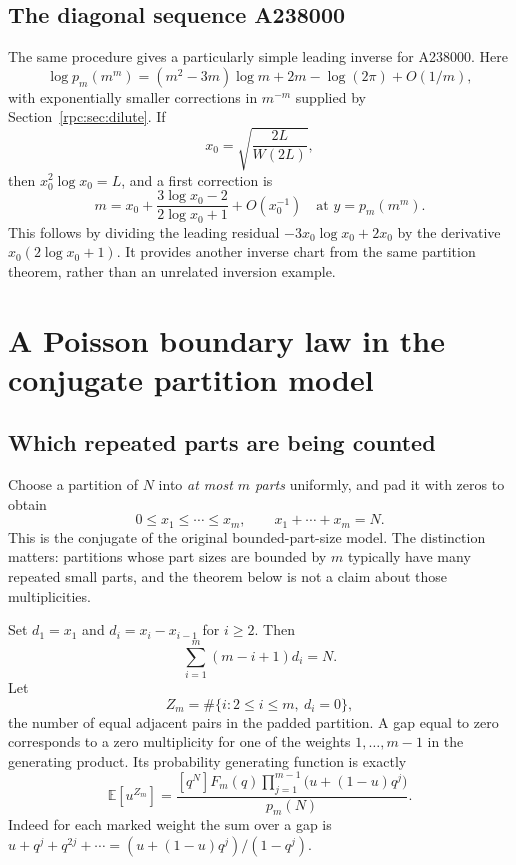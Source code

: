 \documentclass[11pt]{article}
\theoremstyle{definition}
\theoremstyle{remark}
\newcommand{\E}{\mathbb E}
\numberwithin{equation}{section}
\begin{document}
\subsection{The diagonal sequence A238000}

The same procedure gives a particularly simple leading inverse for A238000.
Here
\[
 \log p_m(m^m)=(m^2-3m)\log m+2m-\log(2\pi)+O(1/m),
\]
with exponentially smaller corrections in $m^{-m}$ supplied by
Section~\ref{rpc:sec:dilute}. If
\[
 x_0=\sqrt{\frac{2L}{W(2L)}},
\]
then $x_0^2\log x_0=L$, and a first correction is
\begin{equation}\label{rpc:eq:diaginverse}
 m=x_0+\frac{3\log x_0-2}{2\log x_0+1}+O(x_0^{-1})
                         \quad\text{at }y=p_m(m^m).
\end{equation}
This follows by dividing the leading residual $-3x_0\log x_0+2x_0$
by the derivative $x_0(2\log x_0+1)$. It provides another inverse chart from
the same partition theorem, rather than an unrelated inversion example.

\section{A Poisson boundary law in the conjugate partition model}
\label{rpc:sec:poisson}

\subsection{Which repeated parts are being counted}

Choose a partition of $N$ into \emph{at most $m$ parts} uniformly, and pad it
with zeros to obtain
\[
 0\le x_1\le\cdots\le x_m,\qquad x_1+\cdots+x_m=N.
\]
This is the conjugate of the original bounded-part-size model.
The distinction matters: partitions whose part sizes are bounded by $m$
typically have many repeated small parts, and the theorem below is not a
claim about those multiplicities.

Set $d_1=x_1$ and $d_i=x_i-x_{i-1}$ for $i\ge2$. Then
\[
 \sum_{i=1}^m(m-i+1)d_i=N.
\]
Let
\[
 Z_m=\#\{i:2\le i\le m,\ d_i=0\},
\]
the number of equal adjacent pairs in the padded partition. A gap equal to
zero corresponds to a zero multiplicity for one of the weights $1,\ldots,m-1$
in the generating product. Its probability generating function is exactly
\begin{equation}\label{rpc:eq:pgf}
 \E[u^{Z_m}]=
 \frac{[q^N]F_m(q)\prod_{j=1}^{m-1}\bigl(u+(1-u)q^j\bigr)}{p_m(N)}.
\end{equation}
Indeed for each marked weight the sum over a gap is
$u+q^j+q^{2j}+\cdots=(u+(1-u)q^j)/(1-q^j)$.
\end{document}
